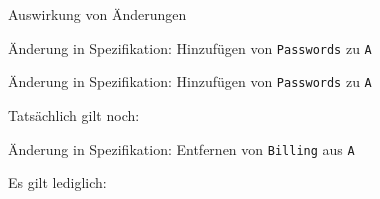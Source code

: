 \documentclass[18pt]{beamer}
\newcommand{\kit}[1]{\textcolor{kit-green100}{#1}}
\begin{document}
\begin{frame}[fragile]{Auswirkung von Änderungen}
\vfill

\begin{overprint}
\kit{Änderung in Spezifikation:} Hinzufügen von \texttt{Passwords} zu \texttt{A}
\begin{center}
\end{center}

\kit{Änderung in Spezifikation:} Hinzufügen von \texttt{Passwords} zu \texttt{A}
\begin{center}
\end{center}



\kit{Tatsächlich gilt noch:} \vphantom{Änderung}
\begin{center}
\end{center}

\kit{Änderung in Spezifikation:} Entfernen von \texttt{Billing} aus \texttt{A}
\begin{center}
\end{center}

\kit{Es gilt lediglich:} \vphantom{Änderung}
\begin{center}
\end{center}



\end{overprint}

\end{frame}
\end{document}
